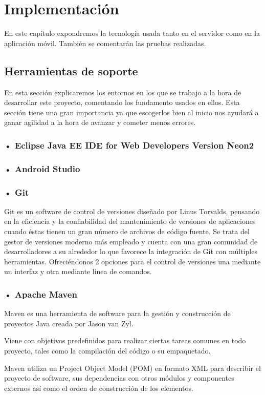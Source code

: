 
\section{Implementación}
En este capítulo expondremos la tecnología usada tanto en el servidor como en la aplicación móvil. También se comentarán las pruebas realizadas.


\subsection{Herramientas de soporte}
En esta sección explicaremos los entornos en los que se trabajo a la hora de desarrollar este proyecto, comentando los fundamento usados en ellos. Esta sección tiene una gran importancia ya que escogerlos bien al inicio nos ayudará a ganar agilidad a la hora de avanzar y cometer menos errores.


\subsubsection{• Eclipse Java EE IDE for Web Developers Version Neon2 }
\subsubsection{• Android Studio}
\subsubsection{• Git}
 Git es un software de control de versiones diseñado por Linus Torvalds, pensando en la eficiencia y la confiabilidad del mantenimiento de versiones de aplicaciones cuando éstas tienen un gran número de archivos de código fuente. Se trata del gestor de versiones moderno
más empleado y cuenta con una gran comunidad de desarrolladores a su alrededor lo
que favorece la integración de Git con múltiples herramientas. Ofreciéndonos 2 opciones para el control de versiones una mediante un interfaz y otra mediante linea de comandos.
\subsubsection{• Apache Maven}
Maven es una herramienta de software para la gestión y construcción de proyectos Java creada por Jason van Zyl.

 Viene con objetivos predefinidos para realizar ciertas tareas comunes en todo proyecto, tales
como la compilación del código o su empaquetado.

 Maven utiliza un Project Object Model (POM) en formato
XML para describir el proyecto de software, sus dependencias con otros módulos
y componentes externos así como el orden de construcción de los elementos.


